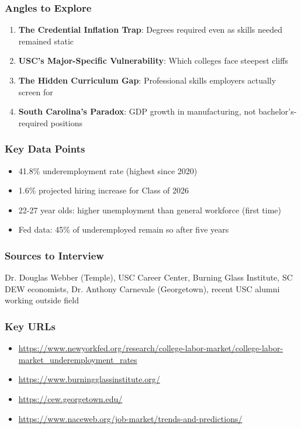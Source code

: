 \documentclass[11pt,letterpaper]{article}
\begin{document}
\subsubsection*{Angles to Explore}
\begin{enumerate}[noitemsep]
    \item \textbf{The Credential Inflation Trap}: Degrees required even as skills needed remained static
    \item \textbf{USC's Major-Specific Vulnerability}: Which colleges face steepest cliffs
    \item \textbf{The Hidden Curriculum Gap}: Professional skills employers actually screen for
    \item \textbf{South Carolina's Paradox}: GDP growth in manufacturing, not bachelor's-required positions
\end{enumerate}

\subsubsection*{Key Data Points}
\begin{itemize}[noitemsep]
    \item 41.8\% underemployment rate (highest since 2020)
    \item 1.6\% projected hiring increase for Class of 2026
    \item 22-27 year olds: higher unemployment than general workforce (first time)
    \item Fed data: 45\% of underemployed remain so after five years
\end{itemize}

\subsubsection*{Sources to Interview}
Dr. Douglas Webber (Temple), USC Career Center, Burning Glass Institute, SC DEW economists, Dr. Anthony Carnevale (Georgetown), recent USC alumni working outside field

\subsubsection*{Key URLs}
\begin{itemize}[noitemsep]
    \item \url{https://www.newyorkfed.org/research/college-labor-market/college-labor-market_underemployment_rates}
    \item \url{https://www.burningglassinstitute.org/}
    \item \url{https://cew.georgetown.edu/}
    \item \url{https://www.naceweb.org/job-market/trends-and-predictions/}
\end{itemize}
\end{document}
